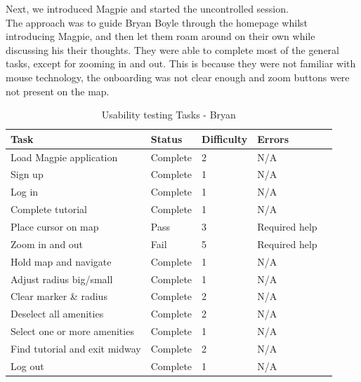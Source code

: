 \noindent Next, we introduced Magpie and started the uncontrolled session.\\
The approach was to guide Bryan Boyle through the homepage whilst introducing Magpie, and then let them roam around on their own while discussing his their thoughts. They were able to complete most of the general tasks, except for zooming in and out. This is because they were not familiar with mouse technology, the onboarding was not clear enough and zoom buttons were not present on the map.
\begin{table}[h!]
    \centering
    \caption{Usability testing Tasks - Bryan}
    \begin{tabular}{|p{}|p{}|p{}|p{}|p{}|}
        \hline
        \textbf{Task}                 & \textbf{Status} & \textbf{Difficulty} & \textbf{Errors} \\
        \hline
        Load Magpie application       & Complete        & 2                   & N/A             \\
        \hline
        Sign up                       & Complete        & 1                   & N/A             \\
        \hline
        Log in                        & Complete        & 1                   & N/A             \\
        \hline
        Complete tutorial             & Complete        & 1                   & N/A             \\
        \hline
        Place cursor on map           & Pass            & 3                   & Required help   \\
        \hline
        Zoom in and out               & Fail            & 5                   & Required help   \\
        \hline
        Hold map and navigate         & Complete        & 1                   & N/A             \\
        \hline
        Adjust radius big/small       & Complete        & 1                   & N/A             \\
        \hline
        Clear marker \& radius        & Complete        & 2                   & N/A             \\
        \hline
        Deselect all amenities        & Complete        & 2                   & N/A             \\
        \hline
        Select one or more amenities  & Complete        & 1                   & N/A             \\
        \hline
        Find tutorial and exit midway & Complete        & 2                   & N/A             \\
        \hline
        Log out                       & Complete        & 1                   & N/A             \\
        \hline
    \end{tabular}
\end{table}\\
